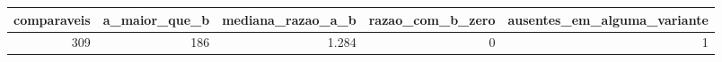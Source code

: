\begin{tabular}{rrrrr}
\toprule
comparaveis & a_maior_que_b & mediana_razao_a_b & razao_com_b_zero & ausentes_em_alguma_variante \\
\midrule
309 & 186 & 1.284 & 0 & 1 \\
\bottomrule
\end{tabular}

